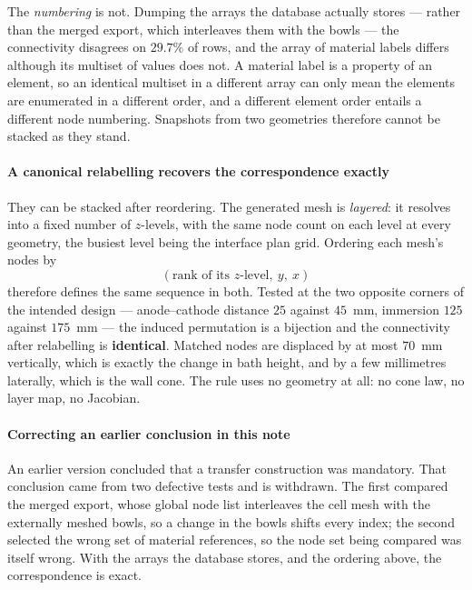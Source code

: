 \documentclass[11pt,a4paper]{article}
\theoremstyle{plain}
\theoremstyle{definition}
\theoremstyle{remark}
\begin{document}
The \emph{numbering} is not. Dumping the arrays the database actually stores ---
rather than the merged export, which interleaves them with the bowls --- the
connectivity disagrees on $29.7\%$ of rows, and the array of material labels
differs although its multiset of values does not. A material label is a property
of an element, so an identical multiset in a different array can only mean the
elements are enumerated in a different order, and a different element order
entails a different node numbering. Snapshots from two geometries therefore
cannot be stacked as they stand.

\label{meas:relabel}
\paragraph{A canonical relabelling recovers the correspondence exactly}
They can be stacked after reordering. The generated mesh is \emph{layered}: it
resolves into a fixed number of $z$-levels, with the same node count on each
level at every geometry, the busiest level being the interface plan grid.
Ordering each mesh's nodes by
\[
  (\text{rank of its } z\text{-level},\ y,\ x)
\]
therefore defines the same sequence in both. Tested at the two opposite corners
of the intended design --- anode--cathode distance $25$ against $45$~mm,
immersion $125$ against $175$~mm --- the induced permutation is a bijection and
the connectivity after relabelling is \textbf{identical}. Matched nodes are
displaced by at most $70$~mm vertically, which is exactly the change in bath
height, and by a few millimetres laterally, which is the wall cone. The rule
uses no geometry at all: no cone law, no layer map, no Jacobian.

\paragraph{Correcting an earlier conclusion in this note}
An earlier version concluded that a transfer construction was mandatory. That
conclusion came from two defective tests and is withdrawn. The first compared
the merged export, whose global node list interleaves the cell mesh with the
externally meshed bowls, so a change in the bowls shifts every index; the second
selected the wrong set of material references, so the node set being compared
was itself wrong. With the arrays the database stores, and the ordering above,
the correspondence is exact.
\end{document}
